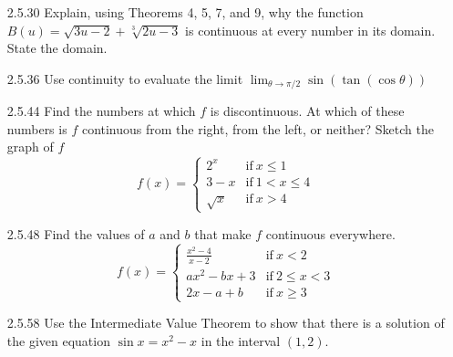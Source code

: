 \documentclass{article}
\begin{document}
\begin{enumerate}
    \item[2.5.30]
        Explain, using Theorems 4, 5, 7, and 9, why the function $B(u) = \sqrt{3u-2} + \sqrt[3]{2u-3}$
        is continuous at every number in its domain. State the domain.

    \vspace{6cm}

    \item[2.5.36]
        Use continuity to evaluate the limit $\displaystyle \lim_{\theta \to \pi/2} \sin\left(\tan\left(\cos{\theta}\right)\right)$

    \vspace{6cm}

    \item[2.5.44]
        Find the numbers at which $f$ is discontinuous.
        At which of these numbers is $f$ continuous from the right, from the left, or neither? Sketch the graph of $f$
        \begin{equation*}
            f(x) =
            \begin{cases}
                2^x & \text{if} \ x \leq 1 \\
                3 - x & \text{if} \ 1 < x \leq 4 \\
                \sqrt{x} & \text{if} \ x > 4
            \end{cases}
        \end{equation*}

    \vspace{6cm}

    \item[2.5.48]
        Find the values of $a$ and $b$ that make $f$ continuous everywhere.
        \begin{equation*}
            f(x) =
            \begin{cases}
                \frac{x^2 - 4}{x - 2} & \text{if} \ x < 2 \\
                ax^2 - bx + 3 & \text{if} \ 2 \leq x < 3 \\
                2x - a + b & \text{if} \ x \geq 3
            \end{cases}
        \end{equation*}

    \vspace{6cm}

    \item[2.5.58]
        Use the Intermediate Value Theorem to show that there is a solution of
        the given equation $\sin{x}=x^2-x$ in the interval $(1,2)$.


\end{enumerate}
\end{document}
